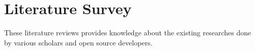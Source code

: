 \documentclass[conference]{IEEEtran}
\begin{document}
\section{Literature Survey}
These literature reviews provides knowledge about the existing researches done by various scholars and open source developers. 
\end{document}
